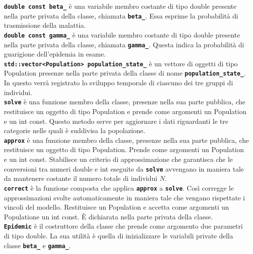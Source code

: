 \documentclass[11pt, a4paper, left=3.5cm, right=3.5cm]{article}
\begin{document}
\textbf{\texttt{double const beta\_}} \`{e} una variabile membro costante di tipo double presente nella parte privata della classe, chiamata \textbf{\texttt{beta\_}}. Essa esprime la probabilit\`{a} di trasmissione della malattia. \\

\textbf{\texttt{double const gamma\_}} \`{e} una variabile membro costante di tipo double presente nella parte privata della classe, chiamata \textbf{\texttt{gamma\_}}. Questa indica la probabilit\`{a} di guarigione dell'epidemia in esame. \\

\textbf{\texttt{std::vector<Population> population\_state\_}} \`{e} un vettore di oggetti di tipo Population presenze nella parte privata della classe di nome \textbf{\texttt{population\_state\_}}. In questo verr\`{a} registrato lo sviluppo temporale di ciascuno dei tre gruppi di individui.\\

\textbf{\texttt{solve}} \`{e} una funzione membro della classe, presenze nella sua parte pubblica, che restituisce un oggetto di tipo Population e prende come argomenti un Population e un int const. Questo metodo serve per aggiornare i dati riguardanti le tre categorie nelle quali \`{e} suddivisa la popolazione.\\

\textbf{\texttt{approx}} \`{e} una funzione membro della classe, presenze nella sua parte pubblica, che restituisce un oggetto di tipo Population. Prende come argomenti un Population e un int const. Stabilisce un criterio di approssimazione che garantisca che le conversioni tra numeri double e int eseguite da \textbf{\texttt{solve}} avvengano in maniera tale da mantenere costante il numero totale di individui $N$.\\

\textbf{\texttt{correct}} \`{e} la funzione composta che applica \textbf{\texttt{approx}} a \textbf{\texttt{solve}}. Cos\`{i} corregge le approssimazioni svolte automaticamente in maniera tale che vengano rispettate i vincoli del modello. Restituisce un Population e accetta come argomenti un Populatione un int const. È dichiarata nella parte privata della classe. \\

\textbf{\texttt{Epidemic}} \`{e} il costruttore della classe che prende come argomento due parametri di tipo double. La sua utilit\`{a} \`{e} quella di inizializzare le variabili private della classe \textbf{\texttt{beta\_}} e \textbf{\texttt{gamma\_}}. \\
\end{document}
